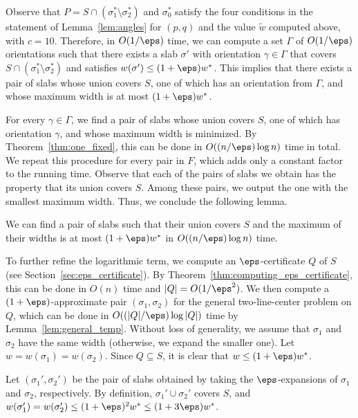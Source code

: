 Observe that $P = S \cap (\sigma_1^* \setminus \sigma_2^*)$ and $\sigma_0^*$ satisfy the four conditions in the statement of Lemma~\ref{lem:angles} for $(p, q)$ and the value $\widetilde w$ computed above, with $c = 10$.  
Therefore, in $O(1/\eps)$ time, we can compute a set $\Gamma$ of $O(1/\eps)$ orientations such that there exists a slab $\sigma'$ with orientation $\gamma \in \Gamma$ that covers $S \cap (\sigma_1^* \setminus \sigma_2^*)$ and satisfies $w(\sigma') \le (1+\eps) w^*$.  
This implies that there exists a pair of slabs whose union covers $S$, one of which has an orientation from $\Gamma$, and whose maximum width is at most $(1+\eps) w^*$.

For every $\gamma \in \Gamma$, we find a pair of slabs whose union covers $S$, one of which has orientation $\gamma$, and whose maximum width is minimized. 
By Theorem~\ref{thm:one_fixed}, this can be done in $O((n/\eps) \log n)$ time in total.  
We repeat this procedure for every pair in $F$, which adds only a constant factor to the running time.
Observe that each of the pairs of slabs we obtain has the property that its union covers $S$.
Among these pairs, we output the one with the smallest maximum width.  
Thus, we conclude the following lemma.



\begin{lemma}  
    \label{lem:general_temp}
    We can find a pair of slabs such that their union covers $S$ and the maximum of their widths is at most $(1+\eps)w^*$ in $O((n/\eps) \log n)$ time. 
\end{lemma}



To further refine the logarithmic term, we compute an $\eps$-certificate $Q$ of $S$ (see Section~\ref{sec:eps_certificate}). 
By Theorem~\ref{thm:computing_eps_certificate}, this can be done in $O(n)$ time and $|Q| = O(1/\eps^2)$. 
We then compute a $(1+\eps)$-approximate pair $(\sigma_1, \sigma_2)$ for the general two-line-center problem on $Q$, which can be done in $O((|Q|/\eps)\log |Q|)$ time by Lemma~\ref{lem:general_temp}.
Without loss of generality, we assume that $\sigma_1$ and $\sigma_2$ have the same width (otherwise, we expand the smaller one).
Let $w = w(\sigma_1) =  w(\sigma_2)$. 
Since $Q \subseteq S$, it is clear that $w \le (1+\eps)w^*$.

Let $(\sigma_1', \sigma_2')$ be the pair of slabs obtained by taking the $\eps$-expansions of $\sigma_1$ and $\sigma_2$, respectively. 
By definition, $\sigma_1' \cup \sigma_2'$ covers $S$, and 
$w(\sigma_1')= w(\sigma_2') \le (1+\eps)^2 w^* \le (1 +3\eps) w^*$.

